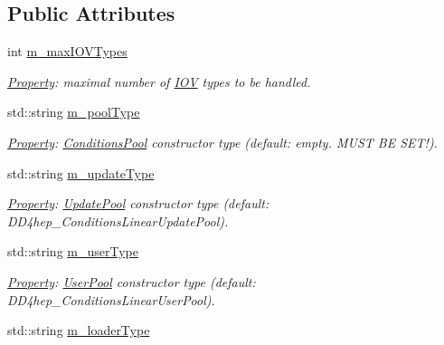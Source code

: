 \subsection*{Public Attributes}
\begin{DoxyCompactItemize}
\item 
int \hyperlink{class_d_d4hep_1_1_conditions_1_1_conditions_manager_object_a8367e7cb7b833dee436e0eacb6c37a87}{m\_\-maxIOVTypes}
\begin{DoxyCompactList}\small\item\em \hyperlink{class_d_d4hep_1_1_property}{Property}: maximal number of \hyperlink{class_d_d4hep_1_1_i_o_v}{IOV} types to be handled. \item\end{DoxyCompactList}\item 
std::string \hyperlink{class_d_d4hep_1_1_conditions_1_1_conditions_manager_object_acbd30bb422ca98796d1eabf4e17706a2}{m\_\-poolType}
\begin{DoxyCompactList}\small\item\em \hyperlink{class_d_d4hep_1_1_property}{Property}: \hyperlink{class_d_d4hep_1_1_conditions_1_1_conditions_pool}{ConditionsPool} constructor type (default: empty. MUST BE SET!). \item\end{DoxyCompactList}\item 
std::string \hyperlink{class_d_d4hep_1_1_conditions_1_1_conditions_manager_object_a015a2e784bea5773c62513f6d24af753}{m\_\-updateType}
\begin{DoxyCompactList}\small\item\em \hyperlink{class_d_d4hep_1_1_property}{Property}: \hyperlink{class_d_d4hep_1_1_conditions_1_1_update_pool}{UpdatePool} constructor type (default: DD4hep\_\-ConditionsLinearUpdatePool). \item\end{DoxyCompactList}\item 
std::string \hyperlink{class_d_d4hep_1_1_conditions_1_1_conditions_manager_object_abe38ba943a936b6322ec553e53f0c7dd}{m\_\-userType}
\begin{DoxyCompactList}\small\item\em \hyperlink{class_d_d4hep_1_1_property}{Property}: \hyperlink{class_d_d4hep_1_1_conditions_1_1_user_pool}{UserPool} constructor type (default: DD4hep\_\-ConditionsLinearUserPool). \item\end{DoxyCompactList}\item 
std::string \hyperlink{class_d_d4hep_1_1_conditions_1_1_conditions_manager_object_adc2a8ecbe9ee734901bdf11dc2e3da0e}{m\_\-loaderType}

\end{DoxyCompactItemize}
